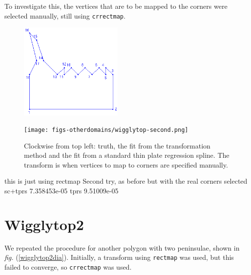 \documentclass[a4paper,10pt]{amsart}
\newcommand{\fig}[1]{\emph{fig.} (\ref{#1})}
\begin{document}
To investigate this, the vertices that are to be mapped to the corners were selected manually, still using \texttt{crrectmap}. 


\begin{figure}
\centering
\includegraphics[width=2in]{figs-otherdomains/wigglytop-numbered.png} \\
\caption{}
\label{wigglynumbered}
\end{figure}

\begin{figure}
\centering
\texttt{[image: figs-otherdomains/wigglytop-second.png]} \\
\caption{Clockwise from top left: truth, the fit from the transformation method and the fit from a standard thin plate regression spline. The transform is when vertices to map to corners are specified manually.}
\label{wigglyseccomp}
\end{figure}




this is just using rectmap
Second try, as before but with the real corners selected
sc+tprs 7.358453e-05 
tprs 9.51009e-05 




\section{Wigglytop2}

We repeated the procedure for another polygon with two peninsulae, shown in \fig{wigglytop2dia}. Initially, a transform using \texttt{rectmap} was used, but this failed to converge, so \texttt{crrectmap} was used.
\end{document}
